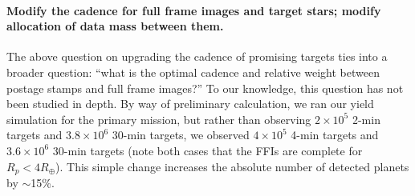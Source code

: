 \paragraph{Modify the cadence for full frame images and target stars; modify allocation of data mass between them.}
The above question on upgrading the cadence of promising targets ties into a broader question: ``what is the optimal cadence and relative weight between postage stamps and full frame images?'' 
To our knowledge, this question has not been studied in depth.
By way of preliminary calculation, we ran our yield simulation for the primary mission, but rather than observing $2\times10^5$ 2-min targets and $3.8\times10^6$ 30-min targets, we observed $4\times10^5$ 4-min targets and $3.6\times10^6$ 30-min targets (note both cases that the FFIs are complete for $R_p<4R_\oplus$).
This simple change increases the absolute number of detected planets by $\sim$15\%.

